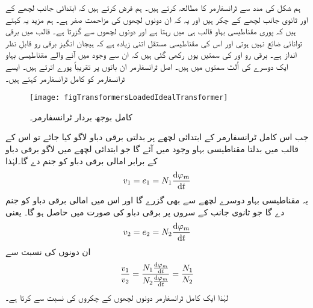 ہم شکل   کی مدد سے ٹرانسفارمر کا مطالعہ کرتے ہیں۔  ہم فرض کرتے ہیں کہ ابتدائی جانب لچھے کے  اور ثانوی جانب لچھے کے  چکر ہیں اور یہ کہ ان  دونوں لچھوں کی مزاحمت صفر ہے۔ ہم مزید یہ کہتے ہیں کہ پوری مقناطیسی بہاو  قالب ہی میں رہتا ہے اور دونوں لچھوں سے گزرتا ہے۔ قالب میں برقی توانائی ضائع نہیں ہوتی اور اس کی مقناطیسی مستقل اتنی زیادہ ہے کہ ہیجان انگیز برقی رو قابلِ نظر انداز ہے۔ برقی رو   اور  کی سمتیں یوں رکھی گئی ہیں کہ ان سے وجود میں آنے والے مقناطیسی بہاو ایک دوسرے کی اُلٹ سمتوں میں  ہیں۔ اصل ٹرانسفارمر ان باتوں پر تقریباً پورے اترتے ہیں۔ ایسے ٹرانسفارمر کو کامل ٹرانسفارمر  کہتے ہیں۔
\begin{figure}
\centering
\texttt{[image: figTransformersLoadedIdealTransformer]}
\caption{کامل بوجھ بردار ٹرانسفارمر۔}
\label{شکل_ٹرانسفارمر_کامل_بار_بردار_ٹرانسفارمر}
\end{figure}

جب اس کامل ٹرانسفارمر کے ابتدائی لچھے پر بدلتی برقی دباو  لاگو کیا جائے تو اس کے قالب میں بدلتا مقناطیسی بہاو   وجود میں  آئے گا جو ابتدائی لچھے میں   لاگو برقی دباو  کے برابر امالی برقی دباو  کو جنم دے گا۔لہٰذا
\begin{align}
v_1=e_1=N_1 \frac{\dif \varphi_m}{\dif t}
\end{align}
یہ مقناطیسی بہاو دوسرے لچھے سے بھی گزرے گا اور اس میں  امالی برقی دباو کو جنم دے گا جو ثانوی جانب کے سروں پر برقی دباو   کی صورت میں حاصل ہو گا۔ یعنی
\begin{align}
v_2=e_2=N_2 \frac{\dif \varphi_m}{\dif t}
\end{align}
ان دونوں کی نسبت سے
\begin{align}\label{مساوات_ٹرانسفارمر_تبادلہ_دباو}
\frac{v_1}{v_2}=\frac{N_1 \frac{\dif \varphi_m}{\dif t}}{N_2 \frac{\dif \varphi_m}{\dif t}}=\frac{N_1}{N_2}
\end{align}
لہٰذا ایک کامل ٹرانسفارمر دونوں لچھوں کے چکروں کی نسبت سے  کرتا ہے۔

